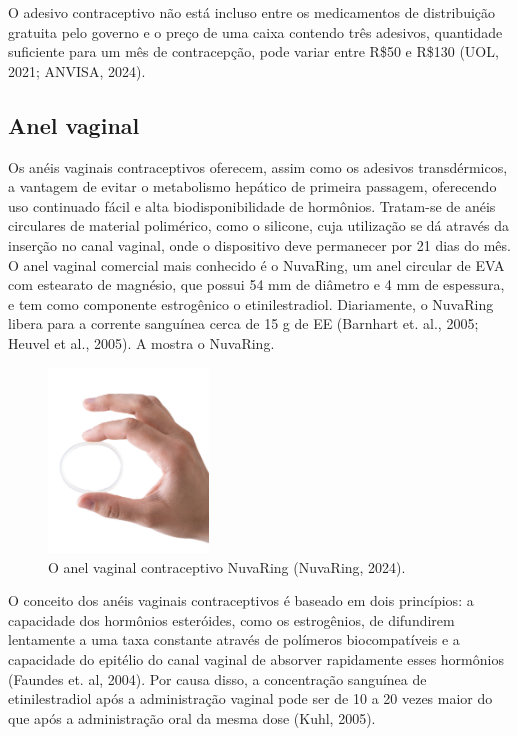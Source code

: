 O adesivo contraceptivo não está incluso entre os medicamentos de distribuição gratuita pelo governo e o preço de uma caixa contendo três adesivos, quantidade suficiente para um mês de contracepção, pode variar entre R\$50 e R\$130 (UOL, 2021; ANVISA, 2024).

\subsection{Anel vaginal}

Os anéis vaginais contraceptivos oferecem, assim como os adesivos transdérmicos, a vantagem de evitar o metabolismo hepático de primeira passagem, oferecendo uso continuado fácil e alta biodisponibilidade de hormônios. Tratam-se de anéis circulares de material polimérico, como o silicone, cuja utilização se dá através da inserção no canal vaginal, onde o dispositivo deve permanecer por 21 dias do mês. O anel vaginal comercial mais conhecido é o NuvaRing{\textregistered}, um anel circular de EVA com estearato de magnésio, que possui 54 mm de diâmetro e 4 mm de espessura, e tem como componente estrogênico o etinilestradiol. Diariamente, o NuvaRing libera para a corrente sanguínea cerca de 15 \textmu g de EE (Barnhart et. al., 2005; Heuvel et al., 2005). A  mostra o NuvaRing. 

\begin{figure}[!htb]
    \centering
        \includegraphics[width=0.38\textwidth]{figuras/nuvaring.png}
        \caption[Anel vaginal]{O anel vaginal contraceptivo NuvaRing{\textregistered} (NuvaRing, 2024).}
    \label{fig:nuvaring}
\end{figure}

O conceito dos anéis vaginais contraceptivos é baseado em dois princípios: a capacidade dos hormônios esteróides, como os estrogênios, de  difundirem lentamente a uma taxa constante através de polímeros biocompatíveis e a capacidade do epitélio do canal vaginal de absorver rapidamente esses hormônios (Faundes et. al, 2004). Por causa disso, a concentração sanguínea de etinilestradiol após a administração vaginal pode ser de 10 a 20 vezes maior do que após a administração oral da mesma dose (Kuhl, 2005).

